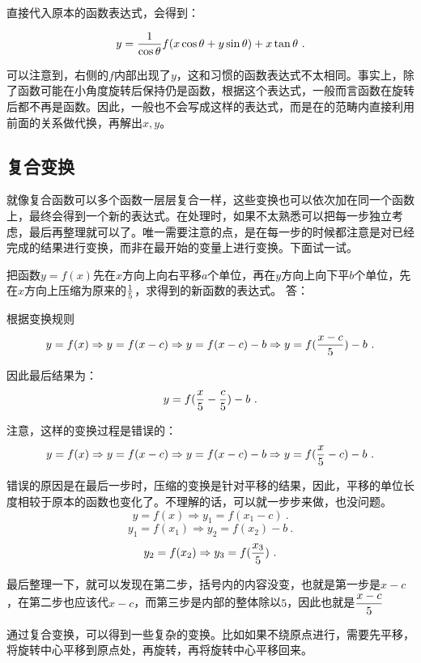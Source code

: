 直接代入原本的函数表达式，会得到：

\begin{equation}
y  ={1\over\cos \theta}f(x \cos \theta + y \sin \theta)+x \tan \theta~.
\end{equation}

可以注意到，右侧的$f$内部出现了$y$，这和习惯的函数表达式不太相同。事实上，除了函数可能在小角度旋转后保持仍是函数，根据这个表达式，一般而言函数在旋转后都不再是函数。因此，一般也不会写成这样的表达式，而是在的范畴内直接利用前面的关系做代换，再解出$x,y$。

\subsection{复合变换}

就像复合函数可以多个函数一层层复合一样，这些变换也可以依次加在同一个函数上，最终会得到一个新的表达式。在处理时，如果不太熟悉可以把每一步独立考虑，最后再整理就可以了。唯一需要注意的点，是在每一步的时候都注意是对已经完成的结果进行变换，而非在最开始的变量上进行变换。下面试一试。

\begin{exercise}{把函数$y=f(x)$先在$x$方向上向右平移$a$个单位，再在$y$方向上向下平$b$个单位，先在$x$方向上压缩为原来的$1\over5$，求得到的新函数的表达式。}
答：

根据变换规则
$$\displaystyle y=f(x)\Rightarrow y=f(x-c)\Rightarrow y=f(x-c)-b\Rightarrow y=f({{x-c}\over 5})-b~.$$

因此最后结果为：
$$y=f({x\over 5}-{c\over5})-b~.$$

注意，这样的变换过程是错误的：
$$\displaystyle y=f(x)\Rightarrow y=f(x-c)\Rightarrow y=f(x-c)-b\Rightarrow y=f({x\over 5}-c)-b~.$$

错误的原因是在最后一步时，压缩的变换是针对平移的结果，因此，平移的单位长度相较于原本的函数也变化了。不理解的话，可以就一步步来做，也没问题。
$$\displaystyle y=f(x)\Rightarrow y_1=f(x_1-c)~.$$
$$\displaystyle y_1=f(x_1)\Rightarrow y_2=f(x_2)-b~.$$
$$\displaystyle y_2=f(x_2)\Rightarrow y_3=f({{x_3}\over 5})~.$$

最后整理一下，就可以发现在第二步，括号内的内容没变，也就是第一步是$x-c$，在第二步也应该代$x-c$，而第三步是内部的整体除以$5$，因此也就是$\displaystyle {x-c\over5}$

\end{exercise}

通过复合变换，可以得到一些复杂的变换。比如如果不绕原点进行，需要先平移，将旋转中心平移到原点处，再旋转，再将旋转中心平移回来。

